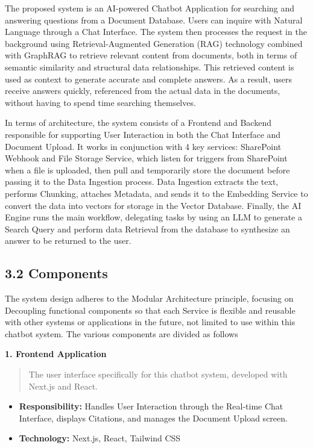 \documentclass[12pt]{article}
\begin{document}
The proposed system is an AI-powered Chatbot Application for searching
and answering questions from a Document Database. Users can inquire with
Natural Language through a Chat Interface. The system then processes the
request in the background using Retrieval-Augmented Generation (RAG)
technology combined with GraphRAG to retrieve relevant content from
documents, both in terms of semantic similarity and structural data
relationships. This retrieved content is used as context to generate
accurate and complete answers. As a result, users receive answers
quickly, referenced from the actual data in the documents, without
having to spend time searching themselves.

In terms of architecture, the system consists of a Frontend and Backend
responsible for supporting User Interaction in both the Chat Interface
and Document Upload. It works in conjunction with 4 key services:
SharePoint Webhook and File Storage Service, which listen for triggers
from SharePoint when a file is uploaded, then pull and temporarily store
the document before passing it to the Data Ingestion process. Data
Ingestion extracts the text, performs Chunking, attaches Metadata, and
sends it to the Embedding Service to convert the data into vectors for
storage in the Vector Database. Finally, the AI Engine runs the main
workflow, delegating tasks by using an LLM to generate a Search Query
and perform data Retrieval from the database to synthesize an answer to
be returned to the user.

\subsection{3.2 Components}\label{components}

The system design adheres to the Modular Architecture principle,
focusing on Decoupling functional components so that each Service is
flexible and reusable with other systems or applications in the future,
not limited to use within this chatbot system. The various components
are divided as follows

\textbf{1. Frontend Application}

\begin{quote}
The user interface specifically for this chatbot system, developed with
Next.js and React.
\end{quote}

\begin{itemize}
\item
  \textbf{Responsibility:} Handles User Interaction through the
  Real-time Chat Interface, displays Citations, and manages the Document
  Upload screen.
\item
  \textbf{Technology:} Next.js, React, Tailwind CSS
\end{itemize}
\end{document}
